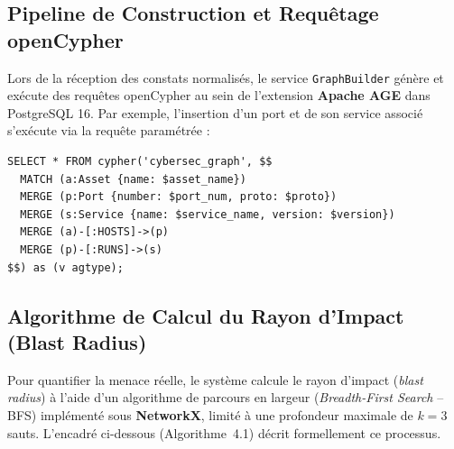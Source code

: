 \subsection{Pipeline de Construction et Requ\^etage openCypher}
\par Lors de la r\'eception des constats normalis\'es, le service \texttt{GraphBuilder} g\'en\`ere et ex\'ecute des requ\^etes openCypher au sein de l'extension \textbf{Apache AGE} dans PostgreSQL 16. Par exemple, l'insertion d'un port et de son service associ\'e s'ex\'ecute via la requ\^ete param\'etr\'ee :
\begin{verbatim}
SELECT * FROM cypher('cybersec_graph', $$
  MATCH (a:Asset {name: $asset_name})
  MERGE (p:Port {number: $port_num, proto: $proto})
  MERGE (s:Service {name: $service_name, version: $version})
  MERGE (a)-[:HOSTS]->(p)
  MERGE (p)-[:RUNS]->(s)
$$) as (v agtype);
\end{verbatim}

\subsection{Algorithme de Calcul du Rayon d'Impact (Blast Radius)}
\par Pour quantifier la menace r\'eelle, le syst\`eme calcule le rayon d'impact (\textit{blast radius}) \`a l'aide d'un algorithme de parcours en largeur (\textit{Breadth-First Search} -- BFS) impl\'ement\'e sous \textbf{NetworkX}, limit\'e \`a une profondeur maximale de $k=3$ sauts. L'encadr\'e ci-dessous (Algorithme~4.1) d\'ecrit formellement ce processus.

